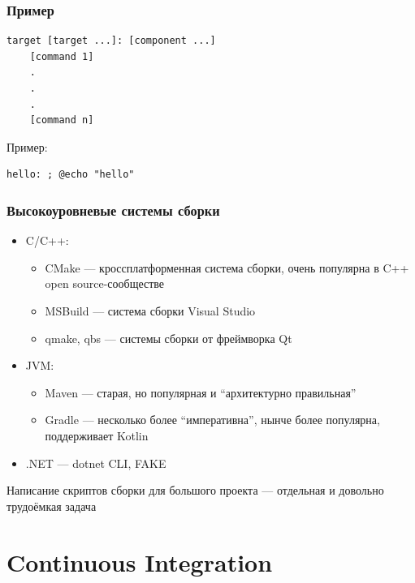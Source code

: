 \documentclass{../../slides-style}
\begin{document}
    \begin{frame}[fragile]
        \frametitle{Пример}
        \begin{footnotesize}
            \begin{verbatim}
target [target ...]: [component ...]
    [command 1]
    .
    .
    .
    [command n]
            \end{verbatim}
        \end{footnotesize}
        Пример:
        \begin{footnotesize}
            \begin{verbatim}
hello: ; @echo "hello"
            \end{verbatim}
        \end{footnotesize}
    \end{frame}

    \begin{frame}
        \frametitle{Высокоуровневые системы сборки}
        \begin{itemize}
            \item C/C++:
            \begin{itemize}
                \item CMake --- кроссплатформенная система сборки, очень популярна в C++ open source-сообществе
                \item MSBuild --- система сборки Visual Studio
                \item qmake, qbs --- системы сборки от фреймворка Qt
            \end{itemize}
            \item JVM:
            \begin{itemize}
                \item Maven --- старая, но популярная и ``архитектурно правильная''
                \item Gradle --- несколько более ``императивна'', нынче более популярна, поддерживает Kotlin
            \end{itemize}
            \item .NET --- dotnet CLI, FAKE
        \end{itemize}
        Написание скриптов сборки для большого проекта --- отдельная и довольно трудоёмкая задача
    \end{frame}

    \section{Continuous Integration}
\end{document}
